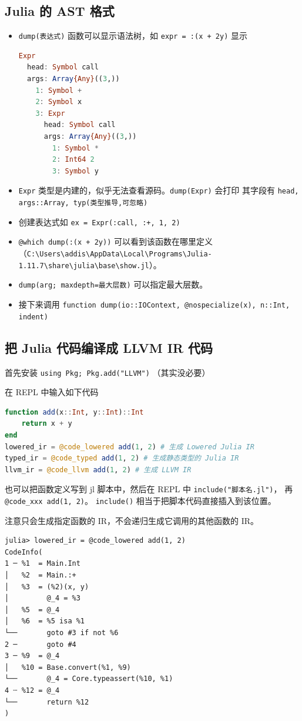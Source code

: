 \subsection{Julia 的 AST 格式}
\begin{itemize}
\item \verb`dump(表达式)` 函数可以显示语法树，如 \verb`expr = :(x + 2y)` 显示
\begin{lstlisting}[language=julia]
Expr
  head: Symbol call
  args: Array{Any}((3,))
    1: Symbol +
    2: Symbol x
    3: Expr
      head: Symbol call
      args: Array{Any}((3,))
        1: Symbol *
        2: Int64 2
        3: Symbol y
\end{lstlisting}
\item \verb`Expr` 类型是内建的，似乎无法查看源码。\verb`dump(Expr)` 会打印 \verb``其字段有 \verb`head, args::Array, typ(类型推导,可忽略)`
\item 创建表达式如 \verb`ex = Expr(:call, :+, 1, 2)`
\item \verb`@which dump(:(x + 2y))` 可以看到该函数在哪里定义（\verb`C:\Users\addis\AppData\Local\Programs\Julia-1.11.7\share\julia\base\show.jl`）。
\item \verb`dump(arg; maxdepth=最大层数)` 可以指定最大层数。
\item 接下来调用 \verb`function dump(io::IOContext, @nospecialize(x), n::Int, indent)`
\end{itemize}


\subsection{把 Julia 代码编译成 LLVM IR 代码}
首先安装 \verb`using Pkg; Pkg.add("LLVM")` （其实没必要）

在 REPL 中输入如下代码
\begin{lstlisting}[language=julia,caption=julia]
function add(x::Int, y::Int)::Int
    return x + y
end
lowered_ir = @code_lowered add(1, 2) # 生成 Lowered Julia IR
typed_ir = @code_typed add(1, 2) # 生成静态类型的 Julia IR
llvm_ir = @code_llvm add(1, 2) # 生成 LLVM IR
\end{lstlisting}

也可以把函数定义写到 jl 脚本中，然后在 REPL 中 \verb`include("脚本名.jl")`， 再 \verb`@code_xxx add(1, 2)`。 \verb`include()` 相当于把脚本代码直接插入到该位置。

注意只会生成指定函数的 IR，不会递归生成它调用的其他函数的 IR。

\begin{lstlisting}[language=none,caption=julia ir]
julia> lowered_ir = @code_lowered add(1, 2)
CodeInfo(
1 ─ %1  = Main.Int
│   %2  = Main.:+
│   %3  = (%2)(x, y)   
│         @_4 = %3
│   %5  = @_4
│   %6  = %5 isa %1
└──       goto #3 if not %6
2 ─       goto #4
3 ─ %9  = @_4
│   %10 = Base.convert(%1, %9)
└──       @_4 = Core.typeassert(%10, %1)
4 ┄ %12 = @_4
└──       return %12
)
\end{lstlisting}

